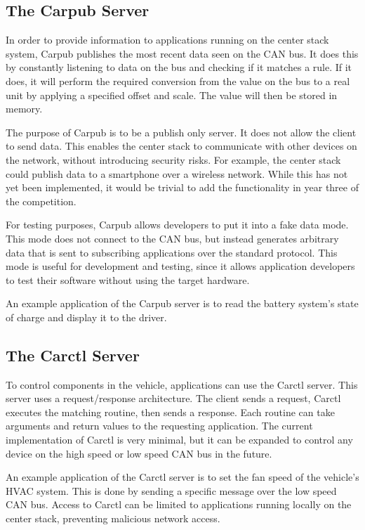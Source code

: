 \documentclass[ece]{uw-wkrpt}
\begin{document}
\subsection{The Carpub Server}

In order to provide information to applications running on the center stack
system, Carpub publishes the most recent data seen on the CAN bus. It does this
by constantly listening to data on the bus and checking if it matches a rule. If
it does, it will perform the required conversion from the value on the bus to a
real unit by applying a specified offset and scale. The value will then be
stored in memory.

The purpose of Carpub is to be a publish only server. It does not allow the
client to send data. This enables the center stack to communicate with other
devices on the network, without introducing security risks. For example, the
center stack could publish data to a smartphone over a wireless network. While
this has not yet been implemented, it would be trivial to add the functionality
in year three of the competition.

For testing purposes, Carpub allows developers to put it into a fake data mode.
This mode does not connect to the CAN bus, but instead generates arbitrary data
that is sent to subscribing applications over the standard protocol. This mode
is useful for development and testing, since it allows application developers to
test their software without using the target hardware.

An example application of the Carpub server is to read the battery system's
state of charge and display it to the driver.

\subsection{The Carctl Server}

To control components in the vehicle, applications can use the Carctl server.
This server uses a request/response architecture. The client sends a request,
Carctl executes the matching routine, then sends a response. Each routine can
take arguments and return values to the requesting application. The current
implementation of Carctl is very minimal, but it can be expanded to control any
device on the high speed or low speed CAN bus in the future.

An example application of the Carctl server is to set the fan speed of the
vehicle's HVAC system. This is done by sending a specific message over the low
speed CAN bus. Access to Carctl can be limited to applications running locally
on the center stack, preventing malicious network access.
\end{document}
